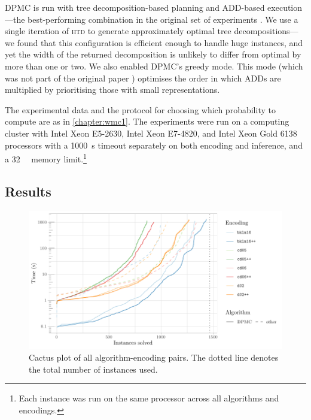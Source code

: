 \textsc{DPMC} is run with tree decomposition-based planning and ADD-based
execution---the best-performing combination in the original set of experiments
\citep{DBLP:conf/cp/DudekPV20}. We use a single iteration of \textsc{htd}
\citep{DBLP:conf/cpaior/AbseherMW17} to generate approximately optimal tree
decompositions---we found that this configuration is efficient enough to handle
huge instances, and yet the width of the returned decomposition is unlikely to
differ from optimal by more than one or two. We also enabled \textsc{DPMC}'s
greedy mode. This mode (which was not part of the original paper
\citep{DBLP:conf/cp/DudekPV20}) optimises the order in which ADDs are multiplied
by prioritising those with small representations.

The experimental data and the protocol for choosing which probability to compute
are as in \cref{chapter:wmc1}. The experiments were run on a computing cluster
with Intel Xeon E5-2630, Intel Xeon E7-4820, and Intel Xeon Gold 6138 processors
with a \SI{1000}{\second} timeout separately on both encoding and inference, and
a \SI{32}{\gibi\byte} memory limit.\footnote{Each instance was run on the same
  processor across all algorithms and encodings.}

\subsection{Results}

\begin{figure}[t]
  \centering
  \includegraphics[width=\textwidth]{chapters/wmc_without_parameters/cumulative}
  \caption{Cactus plot of all algorithm-encoding pairs. The dotted line denotes
    the total number of instances used.}\label{fig:cumulative2}
\end{figure}


